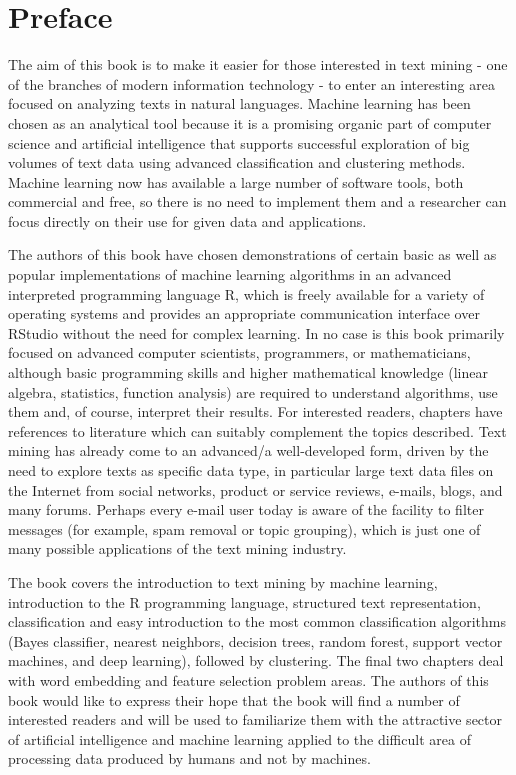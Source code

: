 \documentclass[11pt,openany,executivepaper]{book}
\begin{document}
\chapter*{Preface}
The aim of this book is to make it easier for those interested in text mining -
one of the branches of modern information technology - to enter an interesting
area focused on analyzing texts in natural languages. Machine learning has been
chosen as an analytical tool because it is a promising organic part of computer
science and artificial intelligence that supports successful exploration of big
volumes of text data using advanced classification and clustering methods.
Machine learning now has available a large number of software tools, both
commercial and free, so there is no need to implement them and a researcher can
focus directly on their use for given data and applications.
\setlength{\parindent}{20pt}

The authors of this book have chosen demonstrations of certain basic as
well as popular implementations of machine learning algorithms in an advanced
interpreted programming language R, which is freely available for a variety of
operating systems and provides an appropriate communication interface over
RStudio without the need for complex learning. In no case is this book primarily
focused on advanced computer scientists, programmers, or mathematicians,
although basic programming skills and higher mathematical knowledge (linear
algebra, statistics, function analysis) are required to understand algorithms, use
them and, of course, interpret their results. For interested readers, chapters have
references to literature which can suitably complement the topics described. Text
mining has already come to an advanced/a well-developed form, driven by the
need to explore texts as specific data type, in particular large text data files on
the Internet from social networks, product or service reviews, e-mails, blogs, and
many forums. Perhaps every e-mail user today is aware of the facility to filter
messages (for example, spam removal or topic grouping), which is just one of
many possible applications of the text mining industry.

The book covers the introduction to text mining by machine learning,
introduction to the R programming language, structured text representation, 
classification and easy introduction to the most common classification algorithms
(Bayes classifier, nearest neighbors, decision trees, random forest, support vector
machines, and deep learning), followed by clustering. The final two chapters deal
with word embedding and feature selection problem areas.
The authors of this book would like to express their hope that the book will
find a number of interested readers and will be used to familiarize them with
the attractive sector of artificial intelligence and machine learning applied to the
difficult area of processing data produced by humans and not by machines.
\clearpage
\end{document}

